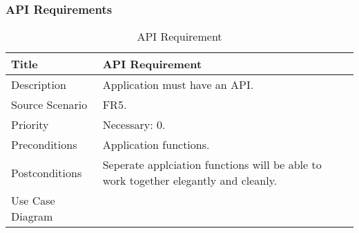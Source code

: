 \subsubsection{API Requirements}
  \begin{table}[h!]
    \caption{API Requirement}
    \label{system-requirements/functional-requirements}
    \begin{tabularx}{\textwidth}{|l|X|}
      \hline
      Title            & API Requirement \\ \hline
      Description      & Application must have an API. \\ \hline
      Source Scenario  & FR5. \\ \hline
      Priority         & Necessary: 0. \\ \hline
      Preconditions    & Application functions. \\ \hline
      Postconditions   & Seperate applciation functions will be able to work
                         together elegantly and cleanly. \\ \hline
      Use Case Diagram & \\ \hline
    \end{tabularx}
  \end{table}

